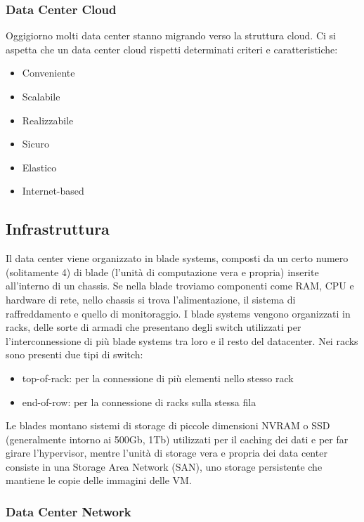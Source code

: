 \documentclass{article}
\providecommand{\tightlist}{%
		  \setlength{\itemsep}{0pt}\setlength{\parskip}{0pt}}
\begin{document}
		\subsubsection{Data Center Cloud}\label{data-center-cloud}
		Oggigiorno molti data center stanno migrando verso la struttura cloud. Ci si aspetta che un data center cloud rispetti determinati criteri e
		caratteristiche:
		\begin{itemize}
		\tightlist
		\item Conveniente
		\item Scalabile
		\item Realizzabile
		\item Sicuro
		\item Elastico
		\item Internet-based
		\end{itemize}
		\subsection{Infrastruttura}
		Il data center viene organizzato in blade systems, composti da un certo numero (solitamente 4) di blade (l'unità di computazione vera e propria) inserite all'interno di un chassis. Se nella blade troviamo componenti come RAM, CPU e hardware di rete, nello chassis si trova l'alimentazione, il sistema di raffreddamento e quello di monitoraggio. I blade systems vengono organizzati in racks, delle sorte di armadi che presentano degli switch utilizzati per l'interconnessione di più blade systems tra loro e il resto del datacenter. Nei racks sono presenti due tipi di switch:
		\begin{itemize}
		\tightlist
		\item top-of-rack: per la connessione di più elementi nello stesso rack
		\item end-of-row: per la connessione di racks sulla stessa fila
		\end{itemize}
		Le blades montano sistemi di storage di piccole
		dimensioni NVRAM o SSD (generalmente intorno ai 500Gb,
		1Tb) utilizzati per il caching dei dati e per far girare
		l'hypervisor, mentre l'unità di storage vera e propria
		dei data center consiste in una Storage Area Network
		(SAN), uno storage persistente che
		mantiene le copie delle immagini delle VM.
		
		\hypertarget{data-center-network}{%
		\subsubsection{Data Center Network}\label{data-center-network}}
		
\end{document}
